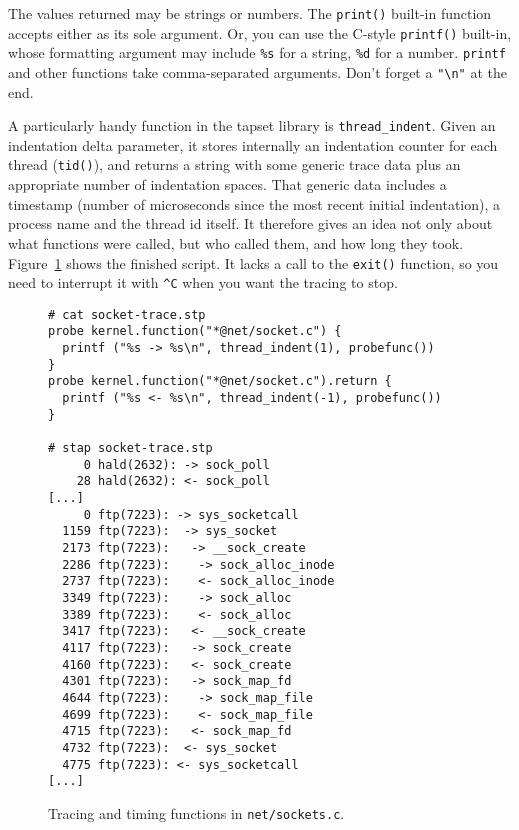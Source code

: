 \documentclass{article}
\newenvironment{boxedminipage}%
    {\begin{makeimage}\begin{center}\begin{Sbox}\begin{minipage}}%
    {\end{minipage}\end{Sbox}\fbox{\TheSbox}\end{center}\end{makeimage}}
\begin{document}
The values returned may be strings or numbers.  The \verb+print()+
built-in function accepts either as its sole argument.  Or, you can
use the C-style \verb+printf()+ built-in, whose formatting argument
may include \verb+%s+ for a string, \verb+%d+ for a number.
\verb+printf+ and other functions take comma-separated arguments.
Don't forget a \verb+"\n"+ at the end.

A particularly handy function in the tapset library is
\verb+thread_indent+.  Given an indentation delta parameter, it stores
internally an indentation counter for each thread (\verb+tid()+), and
returns a string with some generic trace data plus an appropriate
number of indentation spaces.  That generic data includes a timestamp
(number of microseconds since the most recent initial indentation), a
process name and the thread id itself.  It therefore gives an idea not
only about what functions were called, but who called them, and how
long they took.  Figure~\ref{fig:socket-trace} shows the finished
script.  It lacks a call to the \verb+exit()+ function, so you need to
interrupt it with \verb+^C+ when you want the tracing to stop.

\begin{figure}[!ht]
\begin{boxedminipage}{4.5in}
\begin{verbatim}
# cat socket-trace.stp
probe kernel.function("*@net/socket.c") {
  printf ("%s -> %s\n", thread_indent(1), probefunc())
}
probe kernel.function("*@net/socket.c").return {
  printf ("%s <- %s\n", thread_indent(-1), probefunc())
}

# stap socket-trace.stp
     0 hald(2632): -> sock_poll
    28 hald(2632): <- sock_poll
[...]
     0 ftp(7223): -> sys_socketcall
  1159 ftp(7223):  -> sys_socket
  2173 ftp(7223):   -> __sock_create
  2286 ftp(7223):    -> sock_alloc_inode
  2737 ftp(7223):    <- sock_alloc_inode
  3349 ftp(7223):    -> sock_alloc
  3389 ftp(7223):    <- sock_alloc
  3417 ftp(7223):   <- __sock_create
  4117 ftp(7223):   -> sock_create
  4160 ftp(7223):   <- sock_create
  4301 ftp(7223):   -> sock_map_fd
  4644 ftp(7223):    -> sock_map_file
  4699 ftp(7223):    <- sock_map_file
  4715 ftp(7223):   <- sock_map_fd
  4732 ftp(7223):  <- sys_socket
  4775 ftp(7223): <- sys_socketcall
[...]
\end{verbatim}
\end{boxedminipage}
\caption{Tracing and timing functions in {\tt net/sockets.c}.}
\label{fig:socket-trace}
\end{figure}
\end{document}
